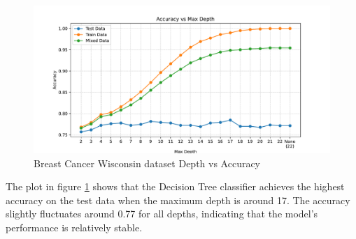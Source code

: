 \begin{figure}[H]
    \centering
    \includegraphics[width=\textwidth]{figures/wine_quality_accuracy_vs_max_depth.pdf}
    \caption{Breast Cancer Wisconsin dataset Depth vs Accuracy}
    \label{fig:wine_quality_accuracy_vs_max_depth}
\end{figure}

The plot in figure \ref{fig:wine_quality_accuracy_vs_max_depth} shows that the Decision Tree classifier achieves the highest accuracy on the test data when the maximum depth is around 17. The accuracy slightly fluctuates around 0.77 for all depths, indicating that the model's performance is relatively stable.

